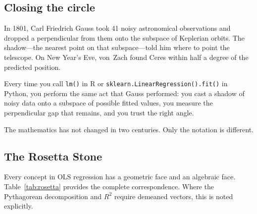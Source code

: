\subsection*{Closing the circle}

In 1801, Carl Friedrich Gauss took 41 noisy astronomical observations and
dropped a perpendicular from them onto the subspace of Keplerian orbits.
The shadow---the nearest point on that subspace---told him where to
point the telescope.  On New Year's Eve, von~Zach found Ceres within
half a degree of the predicted position.

Every time you call \texttt{lm()} in R or
\texttt{sklearn.LinearRegression().fit()} in Python, you perform
the same act that Gauss performed: you cast a shadow of noisy data
onto a subspace of possible fitted values, you measure the
perpendicular gap that remains, and you trust the right angle.

The mathematics has not changed in two centuries.  Only the notation
is different.

\subsection*{The Rosetta Stone}

Every concept in OLS regression has a geometric face and an algebraic
face.  Table~\ref{tab:rosetta} provides the complete correspondence.
Where the Pythagorean decomposition and $R^2$ require demeaned vectors,
this is noted explicitly.

